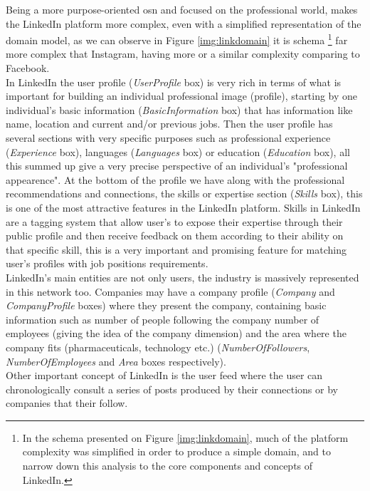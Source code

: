 \indent Being a more purpose-oriented \gls{osn} and focused on the professional
world, makes the LinkedIn platform more complex, even with a simplified representation of the domain model, as we can observe in Figure \ref{img:linkdomain} it is schema
\footnote{\indent In the schema presented on Figure \ref{img:linkdomain}, much of the platform complexity was simplified in order to produce a simple domain, and to narrow
down this analysis to the core components and concepts of LinkedIn.}
far more complex that Instagram, having more or a similar complexity comparing to Facebook.\\
\indent In LinkedIn the user profile (\textit{UserProfile} box) is very rich in terms of what is important for building an individual professional image (profile),
starting by one individual's basic information (\textit{BasicInformation} box) that has information like name, location and current and/or previous jobs. Then
the user profile has several sections with very specific purposes such as professional experience (\textit{Experience} box), languages (\textit{Languages} box) or
education (\textit{Education} box), all this summed up give a very precise perspective of an individual's "professional appearence". At the bottom of the profile
we have along with the professional recommendations and connections, the skills or expertise section (\textit{Skills} box), this is one of the most attractive features
in the LinkedIn platform. Skills in LinkedIn are a tagging system that allow user's to expose their expertise through their public profile and then receive feedback
on them according to their ability on that specific skill, this is a very important and promising feature for matching user's profiles with
job positions requirements.\\
\indent LinkedIn's main entities are not only users, the industry is massively represented in this network too. Companies may have a company profile
(\textit{Company} and \textit{CompanyProfile} boxes) where they present the company, containing basic information such as number of people following the company
number of employees (giving the idea of the company dimension) and the area where the company fits (pharmaceuticals, technology etc.) (\textit{NumberOfFollowers},
\textit{NumberOfEmployees} and \textit{Area} boxes respectively).\\
\indent Other important concept of LinkedIn is the user feed where the user can chronologically consult a series of posts produced by their connections
or by companies that their follow.


